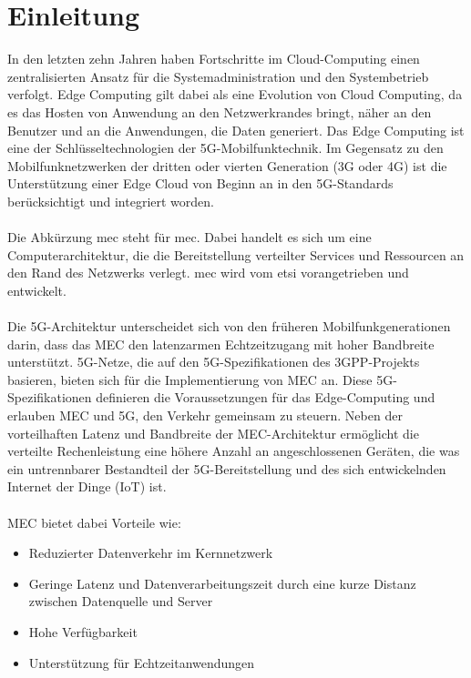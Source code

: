 \documentclass[runningheads]{llncs}
\numberwithin{figure}{section}
\begin{document}
\section{Einleitung}
\label{sec:Einleitung}
In den letzten zehn Jahren haben Fortschritte im Cloud-Computing einen zentralisierten Ansatz für die Systemadministration und den 
Systembetrieb verfolgt. Edge Computing gilt dabei als eine Evolution von Cloud Computing, da es das Hosten von Anwendung an den
Netzwerkrandes bringt, näher an den Benutzer und an die Anwendungen, die Daten generiert. 
Das Edge Computing ist eine der Schlüsseltechnologien der 5G-Mobilfunktechnik. 
Im Gegensatz zu den Mobilfunknetzwerken der dritten oder vierten Generation (3G oder 4G) ist die Unterstützung einer Edge Cloud 
von Beginn an in den 5G-Standards berücksichtigt und integriert worden.
\\
\\
Die Abkürzung \acrshort{mec} steht für  \acrlong{mec}. Dabei handelt es sich um eine Computerarchitektur,
die die Bereitstellung verteilter Services und Ressourcen an den Rand des Netzwerks verlegt. \acrshort{mec} wird vom
\acrfull{etsi} vorangetrieben und entwickelt. 
\\
\\ 
Die 5G-Architektur unterscheidet sich von den früheren Mobilfunkgenerationen darin, 
dass das MEC den latenzarmen Echtzeitzugang mit hoher Bandbreite unterstützt. 
5G-Netze, die auf den 5G-Spezifikationen des 3GPP-Projekts basieren, 
bieten sich für die Implementierung von MEC an. 
Diese 5G-Spezifikationen definieren die Voraussetzungen für das Edge-Computing und erlauben MEC und 5G, 
den Verkehr gemeinsam zu steuern. 
Neben der vorteilhaften Latenz und Bandbreite der MEC-Architektur 
ermöglicht die verteilte Rechenleistung eine höhere Anzahl an angeschlossenen Geräten, 
die was ein untrennbarer Bestandteil der 5G-Bereitstellung und des sich entwickelnden Internet der Dinge (IoT) ist.   
\\
\\
MEC bietet dabei Vorteile wie: \cite{etsiETSIGSMEC}\cite{samikekkiwalterfeatherstoneyonggangfangpekkakuurealicelianuragranjanETSIMultiaccessEdge}
\begin{itemize}
  \item Reduzierter Datenverkehr im Kernnetzwerk
  \item Geringe Latenz und Datenverarbeitungszeit durch eine kurze Distanz zwischen Datenquelle und Server
  \item Hohe Verfügbarkeit
  \item Unterstützung für Echtzeitanwendungen
\end{itemize}
\end{document}
